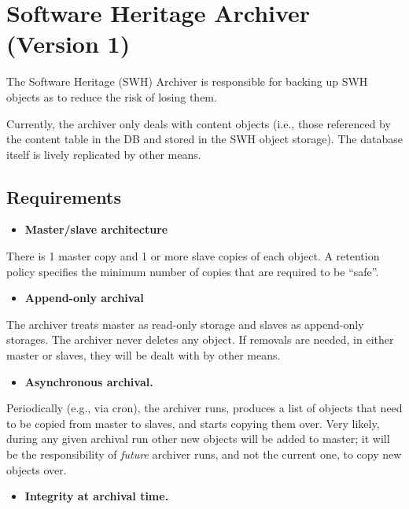 \section{Software Heritage Archiver (Version
1)}\label{software-heritage-archiver-version-1}

The Software Heritage (SWH) Archiver is responsible for backing up SWH
objects as to reduce the risk of losing them.

Currently, the archiver only deals with content objects (i.e., those
referenced by the content table in the DB and stored in the SWH object
storage). The database itself is lively replicated by other means.

\subsection{Requirements}\label{requirements}

\begin{itemize}
\itemsep1pt\parskip0pt
\item
  \textbf{Master/slave architecture}
\end{itemize}

There is 1 master copy and 1 or more slave copies of each object. A
retention policy specifies the minimum number of copies that are
required to be ``safe''.

\begin{itemize}
\itemsep1pt\parskip0pt
\item
  \textbf{Append-only archival}
\end{itemize}

The archiver treats master as read-only storage and slaves as
append-only storages. The archiver never deletes any object. If removals
are needed, in either master or slaves, they will be dealt with by other
means.

\begin{itemize}
\itemsep1pt\parskip0pt
\item
  \textbf{Asynchronous archival.}
\end{itemize}

Periodically (e.g., via cron), the archiver runs, produces a list of
objects that need to be copied from master to slaves, and starts copying
them over. Very likely, during any given archival run other new objects
will be added to master; it will be the responsibility of \emph{future}
archiver runs, and not the current one, to copy new objects over.

\begin{itemize}
\itemsep1pt\parskip0pt
\item
  \textbf{Integrity at archival time.}
\end{itemize}

